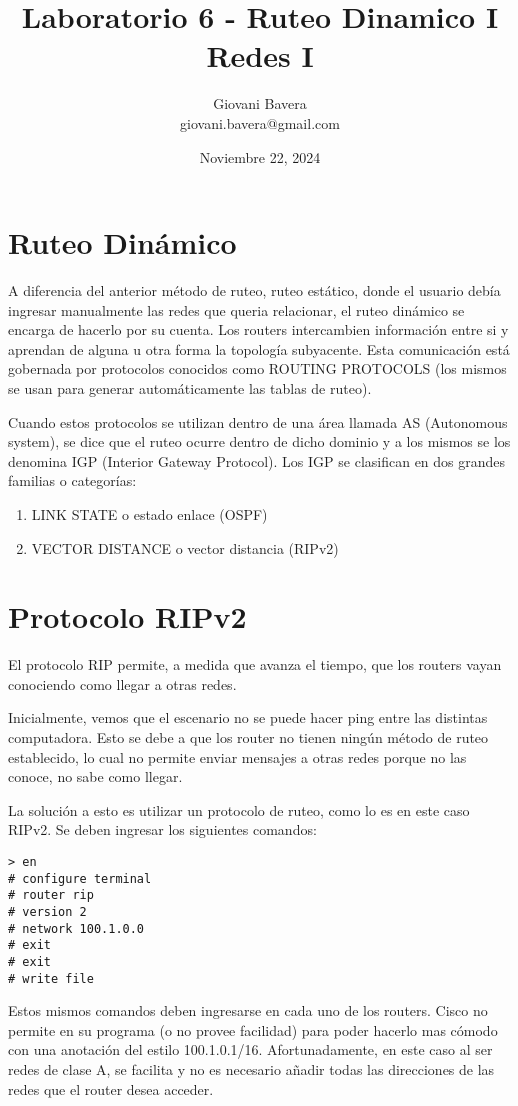 \documentclass{article}
\title{Laboratorio 6 - Ruteo Dinamico I \\ Redes I}
\author{Giovani Bavera \\ giovani.bavera@gmail.com}
\date{Noviembre 22, 2024}
\begin{document}
\maketitle
\section{Ruteo Dinámico}

A diferencia del anterior método de ruteo, ruteo estático, donde el usuario debía ingresar manualmente las redes que queria relacionar, el ruteo dinámico se encarga de hacerlo por su cuenta. Los routers intercambien información entre si y aprendan de alguna u otra forma la topología subyacente. Esta comunicación está gobernada por protocolos conocidos como ROUTING PROTOCOLS (los mismos se usan para generar automáticamente las tablas de ruteo).

Cuando estos protocolos se utilizan dentro de una área llamada AS (Autonomous system), se dice que el ruteo ocurre dentro de dicho dominio y a los mismos se los denomina IGP (Interior Gateway Protocol). Los IGP se clasifican en dos grandes familias o categorías:
\begin{enumerate}
    \item LINK STATE o estado enlace (OSPF)
    \item VECTOR DISTANCE o vector distancia (RIPv2)
\end{enumerate}

\section{Protocolo RIPv2}

El protocolo RIP permite, a medida que avanza el tiempo, que los routers vayan conociendo como llegar a otras redes.

Inicialmente, vemos que el escenario no se puede hacer ping entre las distintas computadora. Esto se debe a que los router no tienen ningún método de ruteo establecido, lo cual no permite enviar mensajes a otras redes porque no las conoce, no sabe como llegar. 

La solución a esto es utilizar un protocolo de ruteo, como lo es en este caso RIPv2. Se deben ingresar los siguientes comandos:

\begin{verbatim}
> en
# configure terminal 
# router rip
# version 2
# network 100.1.0.0
# exit
# exit
# write file     
\end{verbatim}
Estos mismos comandos deben ingresarse en cada uno de los routers. Cisco no permite en su programa (o no provee facilidad) para poder hacerlo mas cómodo con una anotación del estilo 100.1.0.1/16. Afortunadamente, en este caso al ser redes de clase A, se facilita y no es necesario añadir todas las direcciones de las redes que el router desea acceder.
\end{document}
